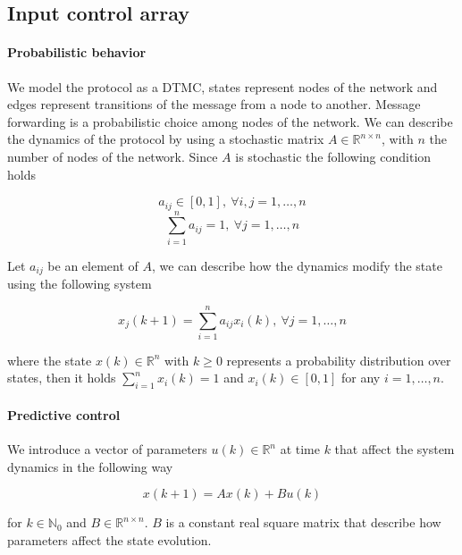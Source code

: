 \documentclass[a4paper, 11pt]{article}
\theoremstyle{definition}
\theoremstyle{remark}
\begin{document}
\subsection{Input control array} \label{subs:inputcontrol}

\paragraph{Probabilistic behavior}
We model the protocol as a DTMC, states represent nodes of the network and edges represent transitions of the message from a node to another. Message forwarding is a probabilistic choice among nodes of the network. We can describe the dynamics of the protocol by using a stochastic matrix $A \in \mathbb{R}^{n\times n}$, with $n$ the number of nodes of the network. Since $A$ is stochastic the following condition holds

\begin{equation} \label{eq:stoc1}
a_{ij} \in [0,1],\ \forall i,j = 1,\dots,n
\end{equation}
\begin{equation} \label{eq:stoc2}
\sum_{i=1}^n a_{ij} = 1,\ \forall j = 1,\dots,n
\end{equation}

Let $a_{ij}$ be an element of $A$, we can describe how the dynamics modify the state using the following system

\begin{equation} \label{eq:system}
	x_j(k+1) = \sum_{i=1}^n a_{ij} x_i(k), \ \forall j = 1,\dots,n
\end{equation}

where the state $x(k) \in \mathbb{R}^n$ with $k \geq 0$ represents a probability distribution over states, then it holds $\sum_{i=1}^n x_i(k) = 1$ and $x_i(k) \in [0,1]$ for any $i = 1,\dots,n$.

\paragraph{Predictive control} %
\label{par:predictive_control}
We introduce a vector of parameters $u(k) \in \mathbb{R}^n$ at time $k$ that affect the system dynamics in the following way

\begin{equation} \label{eq:mpc}
		x(k+1) = Ax(k) + Bu(k)
\end{equation}

for $k \in \mathbb{N}_0$ and $B \in \mathbb{R}^{n\times n}$. $B$ is a constant real square matrix that describe how parameters affect the state evolution.
\end{document}

